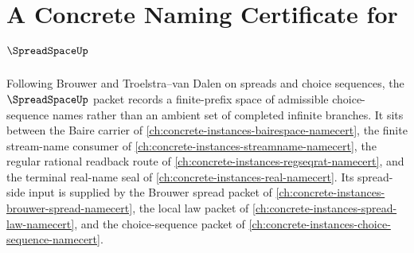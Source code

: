 \chapter{A Concrete Naming Certificate for $\SpreadSpaceUp$}
\label{ch:concrete-instances-spreadspace-namecert}

Following Brouwer and Troelstra--van Dalen on spreads and choice sequences, the $\SpreadSpaceUp$ packet records a finite-prefix space of admissible choice-sequence names rather than an ambient set of completed infinite branches. It sits between the Baire carrier of \autoref{ch:concrete-instances-bairespace-namecert}, the finite stream-name consumer of \autoref{ch:concrete-instances-streamname-namecert}, the regular rational readback route of \autoref{ch:concrete-instances-regseqrat-namecert}, and the terminal real-name seal of \autoref{ch:concrete-instances-real-namecert}. Its spread-side input is supplied by the Brouwer spread packet of \autoref{ch:concrete-instances-brouwer-spread-namecert}, the local law packet of \autoref{ch:concrete-instances-spread-law-namecert}, and the choice-sequence packet of \autoref{ch:concrete-instances-choice-sequence-namecert}.

